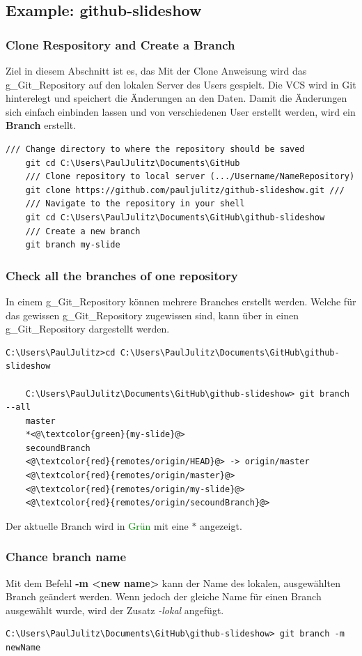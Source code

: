 \subsection{Example: github-slideshow}
\subsubsection{Clone Respository and Create a Branch}
Ziel in diesem Abschnitt ist es, das 
Mit der Clone Anweisung wird das \gls{g_Git_Repository} auf den lokalen Server des Users gespielt. Die \gls{VCS} wird in Git hinterelegt und speichert die Änderungen an den Daten. Damit die Änderungen sich einfach einbinden lassen und von verschiedenen User erstellt werden, wird ein \textbf{Branch} erstellt. 

\begin{lstlisting}[style=CMD]
	/// Change directory to where the repository should be saved
	git cd C:\Users\PaulJulitz\Documents\GitHub
	/// Clone repository to local server (.../Username/NameRepository)
	git clone https://github.com/pauljulitz/github-slideshow.git /// 
	/// Navigate to the repository in your shell
	git cd C:\Users\PaulJulitz\Documents\GitHub\github-slideshow
	/// Create a new branch
	git branch my-slide
\end{lstlisting}

\subsubsection{Check all the branches of one repository}
In einem \gls{g_Git_Repository} können mehrere Branches erstellt werden. Welche für das gewissen \gls{g_Git_Repository} zugewissen sind, kann über  in einen \gls{g_Git_Repository} dargestellt werden.

\begin{lstlisting}[style=CMD]
	C:\Users\PaulJulitz>cd C:\Users\PaulJulitz\Documents\GitHub\github-slideshow
	
	C:\Users\PaulJulitz\Documents\GitHub\github-slideshow> git branch --all
	master
	*<@\textcolor{green}{my-slide}@>
	secoundBranch
	<@\textcolor{red}{remotes/origin/HEAD}@> -> origin/master
	<@\textcolor{red}{remotes/origin/master}@>
	<@\textcolor{red}{remotes/origin/my-slide}@>
	<@\textcolor{red}{remotes/origin/secoundBranch}@>
\end{lstlisting}

Der aktuelle Branch wird in \textcolor{green}{Grün} mit eine $*$ angezeigt.

\subsubsection{Chance branch name}
Mit dem Befehl \textbf{-m <new name>} kann der Name des lokalen, ausgewählten Branch geändert werden. Wenn jedoch der gleiche Name für einen Branch ausgewählt wurde, wird der Zusatz \textit{-lokal} angefügt.
\begin{lstlisting}[style=CMD]
	C:\Users\PaulJulitz\Documents\GitHub\github-slideshow> git branch -m newName
\end{lstlisting}

